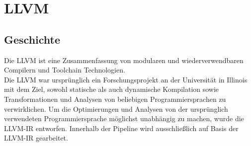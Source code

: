 \chapter{LLVM}
\section{Geschichte \cite{LLVMWebsite}\cite{LLVMResearchBeginning}}
Die \ac{LLVM} ist eine Zusammenfassung von modularen und wiederverwendbaren Compilern und Toolchain Technologien.\\
Die \ac{LLVM} war ursprünglich ein Forschungsprojekt an der Universität in Illinois mit dem Ziel, sowohl statische als auch dynamische Kompilation sowie Transformationen und Analysen von beliebigen Programmiersprachen zu verwirklichen.
Um die Optimierungen und Analysen von der ursprünglich verwendeten Programmiersprache möglichst unabhängig zu machen, wurde die \ac{LLVM-IR} entworfen. Innerhalb der Pipeline wird ausschließlich auf Basis der \ac{LLVM-IR} gearbeitet.

